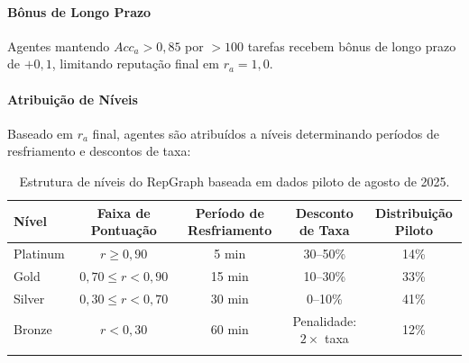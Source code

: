 \documentclass[11pt]{article}
\begin{document}
\paragraph{Bônus de Longo Prazo} Agentes mantendo $Acc_a > 0,85$ por $>100$ tarefas recebem bônus de longo prazo de $+0,1$, limitando reputação final em $r_a = 1,0$.

\paragraph{Atribuição de Níveis} Baseado em $r_a$ final, agentes são atribuídos a níveis determinando períodos de resfriamento e descontos de taxa:
\begin{longtable}{@{}lcccc@{}}
\toprule
\textbf{Nível} & \textbf{Faixa de Pontuação} & \textbf{Período de Resfriamento} & \textbf{Desconto de Taxa} & \textbf{Distribuição Piloto} \\\midrule
Platinum & $r \geq 0,90$ & 5 min & 30--50\% & 14\% \\
Gold & $0,70 \leq r < 0,90$ & 15 min & 10--30\% & 33\% \\
Silver & $0,30 \leq r < 0,70$ & 30 min & 0--10\% & 41\% \\
Bronze & $r < 0,30$ & 60 min & Penalidade: $2 \times$ taxa & 12\% \\\bottomrule
\caption{Estrutura de níveis do RepGraph baseada em dados piloto de agosto de 2025.}
\label{tab:reputation-tiers}
\end{longtable}
\end{document}

